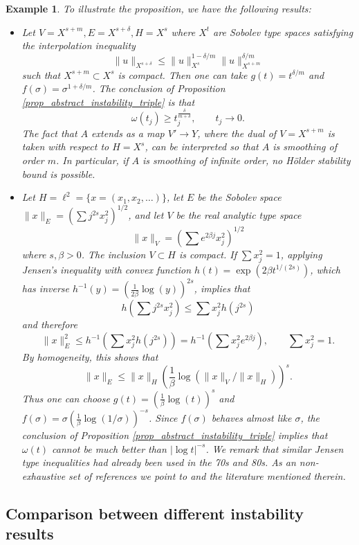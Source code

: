 \documentclass[12pt,twoside]{amsart}
\numberwithin{equation}{section}
\renewcommand{\leq}{\leqslant}
\renewcommand{\geq}{\geqslant}
\newtheorem{example}[theorem]{Example}
\newcommand{\abs}[1]{\lvert #1 \rvert}          %
\newcommand{\norm}[1]{\lVert #1 \rVert}         %
\begin{document}
\begin{appendix}
\begin{example} \label{ex:interpol_triple}
To illustrate the proposition, we have the following results: 
\begin{itemize}
\item 
Let $V = X^{s+m}, E = X^{s+\delta}, H = X^s$ where $X^t$ are Sobolev type spaces satisfying the interpolation inequality 
\[
\norm{u}_{X^{s+\delta}} \leq \norm{u}_{X^s}^{1-\delta/m} \norm{u}_{X^{s+m}}^{\delta/m}
\]
such that $X^{s+m} \subset X^s$ is compact. Then one can take $g(t) = t^{\delta/m}$ and $f(\sigma) = \sigma^{1+\delta/m}$. The conclusion of Proposition \ref{prop_abstract_instability_triple} is that 
\[
\omega(t_j) \geq t_j^{\frac{\delta}{m+\delta}}, \qquad t_j \to 0.
\]
The fact that $A$ extends as a map $V' \to Y$, where the dual of $V = X^{s+m}$ is taken with respect to $H = X^s$, can be interpreted so that $A$ is smoothing of order $m$. In particular, if $A$ is smoothing of infinite order, no H\"older stability bound is possible.
\item 
Let $H = \ell^2 = \{ x = (x_1, x_2, \ldots) \}$, let $E$ be the Sobolev space $\norm{x}_E = (\sum j^{2s} x_j^2)^{1/2}$, and let $V$ be the real analytic type space 
\[
\norm{x}_V = ( \sum e^{2\beta j} x_j^2)^{1/2}
\]
where $s, \beta > 0$. The inclusion $V \subset H$ is compact. If $\sum x_j^2 = 1$, applying Jensen's inequality with convex function $h(t) = \exp(2 \beta t^{1/(2s)})$, which has inverse $h^{-1}(y) = ( \frac{1}{2\beta} \log(y) )^{2s}$, implies that 
\[
h(\sum j^{2s} x_j^2) \leq \sum x_j^2 h(j^{2s})
\]
and therefore 
\[
\norm{x}_E^2 \leq h^{-1}( \sum x_j^2 h(j^{2s}) ) = h^{-1}( \sum x_j^2 e^{2\beta j} ), \qquad \sum x_j^2 = 1.
\]
By homogeneity, this shows that 
\[
\norm{x}_E \leq \norm{x}_H ( \frac{1}{\beta} \log(\norm{x}_V/\norm{x}_H) )^{s}.
\]
Thus one can choose $g(t) = ( \frac{1}{\beta} \log(t) )^{s}$ and $f(\sigma) = \sigma ( \frac{1}{\beta} \log(1/\sigma) )^{-s}$. Since $f(\sigma)$ behaves almost like $\sigma$, the conclusion of Proposition \ref{prop_abstract_instability_triple} implies that $\omega(t)$ cannot be much better than $\abs{\log t}^{-s}$.
We remark that similar Jensen type inequalities had already been used in the 70s and 80s. As an non-exhaustive set of references we point to \cite{TV82,LV85a,LV85b,MP85} and the literature mentioned therein.
\end{itemize}
\end{example}


\subsection{Comparison between different instability results}


\end{appendix}
\end{document}

